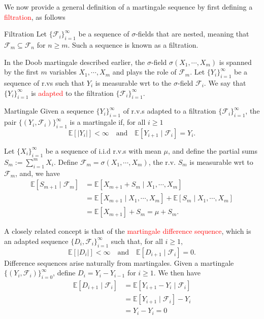 \documentclass[10pt,handout,english]{beamer}
\newcommand{\E}{\mathbb{E}}
\newcommand{\F}{\mathcal{F}}
\newcommand{\1}{\mathbbm{1}}
\begin{document}
\begin{frame}[allowframebreaks]
We now provide a general definition of a martingale sequence by first defining a \textcolor{red}{filtration}, as follows
\begin{block}{Filtration}
Let $\{\F_i\}_{i=1}^{\infty}$ be a sequence of $\sigma$-fields that are nested, meaning that $\F_{m}\subseteq\F_{n}$ for $n\geq m$. Such a sequence is known as a filtration.
\end{block}
In the Doob martingale described earlier, the $\sigma$-field $\sigma(X_1,\cdots,X_m)$ is spanned by the first $m$ variables $X_1,\cdots,X_m$ and plays the role of $\F_m$. Let $\{Y_i\}_{i=1}
^{\infty}$ be a sequence of r.vs such that $Y_i$ is measurable wrt to the $\sigma$-field $\F_{i}$. We say that $\{Y_i\}_{i=1}^{\infty}$ is \textcolor{red}{adapted} to the filtration $\{\F_{i}\}_{i=1}^{\infty}$. 
\begin{block}{Martingale}
Given a sequence $\{Y_{i}\}_{i=1}^{\infty}$ of r.v.s adapted to a filtration $\{\F_i\}_{i=1}^{\infty}$, the pair $\{(Y_i,\F_i)\}_{i=1}^{\infty}$ is a martingale if, for all $i\geq 1$
\[
\E[\lvert Y_i\rvert]<\infty\quad\text{and}\quad\E[Y_{i+1}\mid\F_{i}]=Y_{i}.
\]
\end{block}
\begin{example}
Let $\{X_i\}_{i=1}^{\infty}$ be a sequence of i.i.d r.v.s with mean $\mu$, and define the partial sums $S_m:=\sum\limits_{i=1}^mX_i$. Define $\F_{m}=\sigma(X_1,\cdots,X_m)$, the r.v. $S_m$ is measurable wrt to $\F_m$, and, we have
\begin{align*}
\E[S_{m+1}\mid \F_{m}]&=\E[X_{m+1}+S_{m}\mid X_1,\cdots,X_m ]\\
&=\E[X_{m+1}\mid X_1,\cdots,X_m]+\E[S_{m}\mid X_1,\cdots,X_m ]\\
&=\E[X_{m+1}]+S_m=\mu+S_m.
\end{align*}
\end{example}
A closely related concept is that of the \textcolor{red}{martingale difference sequence}, which is an adapted sequence $\{D_i,\F_{i}\}_{i=1}^{\infty}$ such that, for all $i\geq 1$,
\[
\E[\lvert D_i\rvert]<\infty\quad\text{and}\quad\E[D_{i+1}\mid\F_{i}]=0.
\] 
Difference sequences arise naturally from martingales. Given a martingale $\{(Y_i,\F_{i})\}_{i=0}^{\infty}$, define $D_i=Y_i-Y_{i-1}$ for $i\geq 1$. We then have
\begin{align*}
\E[D_{i+1}\mid\F_{i}]&=\E[Y_{i+1}-Y_{i}\mid\F_i]\\
&=\E[Y_{i+1}\mid\F_i]-Y_i\\
&=Y_i-Y_i=0
\end{align*}

\end{frame}
\end{document}
